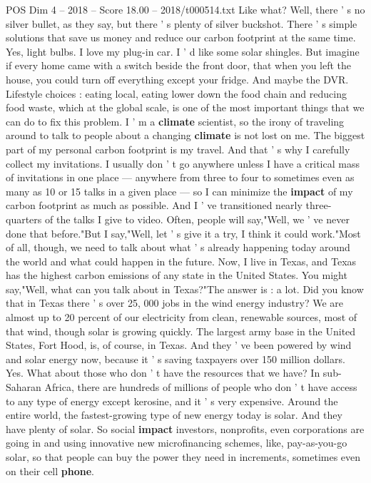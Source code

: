 \begin{textsample}{POS Dim 4 – 2018 – Score 18.00 – 2018/t000514.txt}
Like what?
Well, there ' s no silver bullet, as they say, but there ' s plenty of silver buckshot.
There ' s simple solutions that save us money and reduce our carbon footprint at the same time.
Yes, light bulbs.
I love my plug-in car.
I ' d like some solar shingles.
But imagine if every home came with a switch beside the front door, that when you left the house, you could turn off everything except your fridge.
And maybe the DVR.
Lifestyle choices : eating local, eating lower down the food chain and reducing food waste, which at the global scale, is one of the most important things that we can do to fix this problem.
I ' m a \textbf{climate} scientist, so the irony of traveling around to talk to people about a changing \textbf{climate} is not lost on me.
The biggest part of my personal carbon footprint is my travel.
And that ' s why I carefully collect my invitations.
I usually don ' t go anywhere unless I have a critical mass of invitations in one place — anywhere from three to four to sometimes even as many as 10 or 15 talks in a given place — so I can minimize the \textbf{impact} of my carbon footprint as much as possible.
And I ' ve transitioned nearly three-quarters of the talks I give to video.
Often, people will say,"Well, we ' ve never done that before."But I say,"Well, let ' s give it a try, I think it could work."Most of all, though, we need to talk about what ' s already happening today around the world and what could happen in the future.
Now, I live in Texas, and Texas has the highest carbon emissions of any state in the United States.
You might say,"Well, what can you talk about in Texas?"The answer is : a lot.
Did you know that in Texas there ' s over 25, 000 jobs in the wind energy industry?
We are almost up to 20 percent of our electricity from clean, renewable sources, most of that wind, though solar is growing quickly.
The largest army base in the United States, Fort Hood, is, of course, in Texas.
And they ' ve been powered by wind and solar energy now, because it ' s saving taxpayers over 150 million dollars.
Yes.
What about those who don ' t have the resources that we have?
In sub-Saharan Africa, there are hundreds of millions of people who don ' t have access to any type of energy except kerosine, and it ' s very expensive.
Around the entire world, the fastest-growing type of new energy today is solar.
And they have plenty of solar.
So social \textbf{impact} investors, nonprofits, even corporations are going in and using innovative new microfinancing schemes, like, pay-as-you-go solar, so that people can buy the power they need in increments, sometimes even on their cell \textbf{phone}.

\end{textsample}
